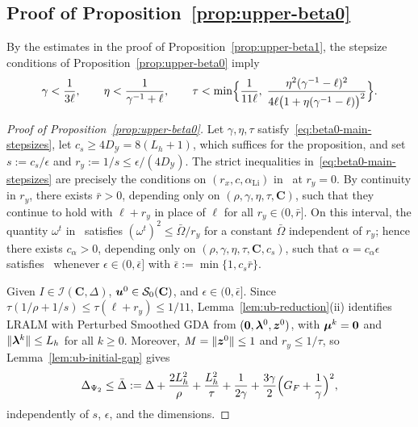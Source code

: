 \subsection{Proof of Proposition~\ref{prop:upper-beta0}}
\label{app:upper-beta0}

By the estimates in the proof of Proposition~\ref{prop:upper-beta1}, the
stepsize conditions of Proposition~\ref{prop:upper-beta0} imply
\begin{equation}
    \gamma<\frac{1}{3\ell},\qquad
    \eta<\frac{1}{\gamma^{-1}+\ell},\qquad
    \tau<\min\Bigl\{\frac{1}{11\ell},\;
    \frac{\eta^2(\gamma^{-1}-\ell)^2}{4\ell\bigl(1+\eta(\gamma^{-1}-\ell)\bigr)^2}\Bigr\}.
    \label{eq:beta0-main-stepsizes}
\end{equation}

\begin{proof}[Proof of Proposition~\ref{prop:upper-beta0}]
Let \(\gamma,\eta,\tau\) satisfy~\eqref{eq:beta0-main-stepsizes}, let
\(c_s\ge4D_{\mathcal Y}=8(L_h+1)\), which suffices for the proposition, and set \(s:=c_s/\epsilon\) and
\(r_y:=1/s\le\epsilon/(4D_{\mathcal Y})\). The strict inequalities
in~\eqref{eq:beta0-main-stepsizes} are precisely the conditions on
\((r_x,c,\alpha_{\mathrm{Li}})\) in~\cite[Condition~3.2]{li2026smoothing} at
\(r_y=0\). By continuity in \(r_y\), there exists \(\bar r>0\), depending only
on \((\rho,\gamma,\eta,\tau,\mathbf C)\), such that they continue to hold
with \(\ell+r_y\) in place of \(\ell\) for all \(r_y\in(0,\bar r]\). On this
interval, the quantity \(\omega^t\) in~\cite[Condition~3.2(ii)]{li2026smoothing}
satisfies \((\omega^t)^2\le\bar\Omega/r_y\) for a constant \(\bar\Omega\)
independent of \(r_y\); hence there exists \(c_\alpha>0\), depending only on
\((\rho,\gamma,\eta,\tau,\mathbf C,c_s)\), such that \(\alpha=c_\alpha\epsilon\)
satisfies~\cite[Condition~3.2(ii)]{li2026smoothing} whenever
\(\epsilon\in(0,\bar\epsilon]\) with \(\bar\epsilon:=\min\{1,c_s\bar r\}\).

Given \(I\in\mathcal I(\mathbf C,\Delta)\), \(\bm{u}^0\in\mathcal S_0(\mathbf C)\),
and \(\epsilon\in(0,\bar\epsilon]\). Since
\(\tau(1/\rho+1/s)\le\tau(\ell+r_y)\le1/11\), Lemma~\ref{lem:ub-reduction}(ii)
identifies LRALM with Perturbed Smoothed GDA from \((\bm{0},\bm{\lambda}^0,\bm{z}^0)\),
with \(\bm{\mu}^k=\bm{0}\) and \(\|\bm{\lambda}^k\|\le L_h\) for all \(k\ge0\). Moreover,
\(M=\|\bm{z}^0\|\le1\) and \(r_y\le1/\tau\), so Lemma~\ref{lem:ub-initial-gap}
gives
\[
\Delta_{\Psi_2}\le\bar\Delta:=\Delta+\frac{2L_h^2}{\rho}+\frac{L_h^2}{\tau}
+\frac1{2\gamma}+\frac{3\gamma}2\Bigl(G_F+\frac1\gamma\Bigr)^2,
\]
independently of \(s\), \(\epsilon\), and the dimensions.


\end{proof}
